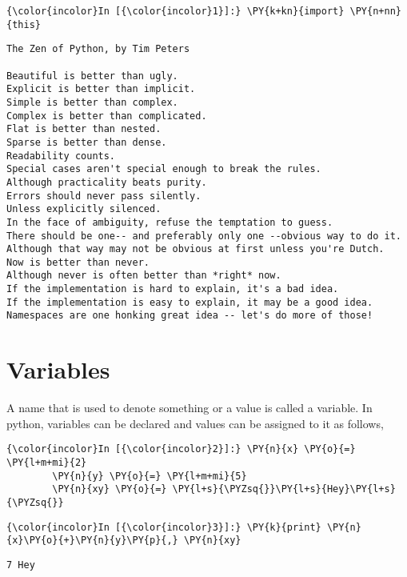     \begin{Verbatim}[commandchars=\\\{\}]
{\color{incolor}In [{\color{incolor}1}]:} \PY{k+kn}{import} \PY{n+nn}{this}
\end{Verbatim}

    \begin{Verbatim}[commandchars=\\\{\}]
The Zen of Python, by Tim Peters

Beautiful is better than ugly.
Explicit is better than implicit.
Simple is better than complex.
Complex is better than complicated.
Flat is better than nested.
Sparse is better than dense.
Readability counts.
Special cases aren't special enough to break the rules.
Although practicality beats purity.
Errors should never pass silently.
Unless explicitly silenced.
In the face of ambiguity, refuse the temptation to guess.
There should be one-- and preferably only one --obvious way to do it.
Although that way may not be obvious at first unless you're Dutch.
Now is better than never.
Although never is often better than *right* now.
If the implementation is hard to explain, it's a bad idea.
If the implementation is easy to explain, it may be a good idea.
Namespaces are one honking great idea -- let's do more of those!
    \end{Verbatim}

    \section{Variables}\label{variables}

    A name that is used to denote something or a value is called a variable.
In python, variables can be declared and values can be assigned to it as
follows,

    \begin{Verbatim}[commandchars=\\\{\}]
{\color{incolor}In [{\color{incolor}2}]:} \PY{n}{x} \PY{o}{=} \PY{l+m+mi}{2}
        \PY{n}{y} \PY{o}{=} \PY{l+m+mi}{5}
        \PY{n}{xy} \PY{o}{=} \PY{l+s}{\PYZsq{}}\PY{l+s}{Hey}\PY{l+s}{\PYZsq{}}
\end{Verbatim}

    \begin{Verbatim}[commandchars=\\\{\}]
{\color{incolor}In [{\color{incolor}3}]:} \PY{k}{print} \PY{n}{x}\PY{o}{+}\PY{n}{y}\PY{p}{,} \PY{n}{xy}
\end{Verbatim}

    \begin{Verbatim}[commandchars=\\\{\}]
7 Hey
    \end{Verbatim}

